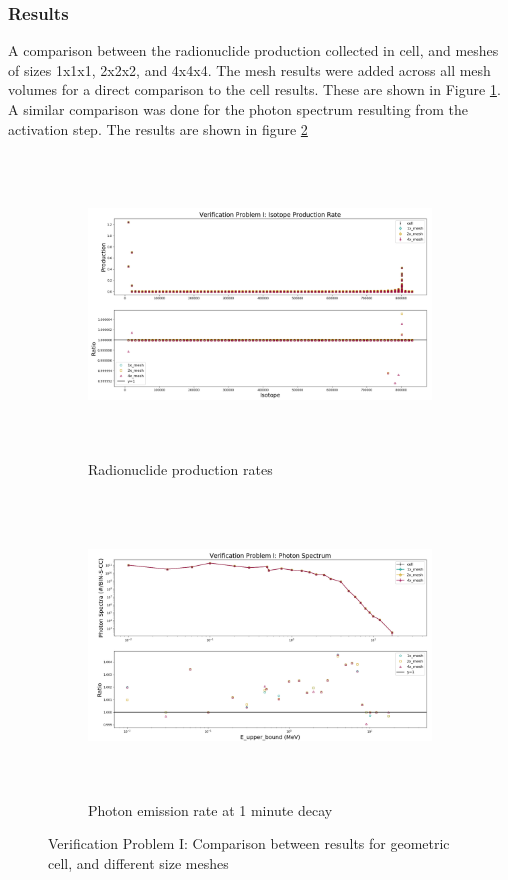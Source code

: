 \subsubsection{Results}
A comparison between the radionuclide production collected in cell,
and meshes of sizes 1x1x1, 2x2x2, and 4x4x4. The mesh results were added
across all mesh volumes for a direct
comparison to the cell results. These are shown in Figure \ref{fig:1prod_cell_2x_4x}.
A similar comparison was done for the photon spectrum resulting from the activation
step. The results are shown in figure \ref{fig:1spec_cell_2x_4x}
\begin{figure}[h!]
 \begin{centering}
 \centering
 \begin{subfigure}[b]{.8\textwidth}
 \includegraphics[width=0.99\linewidth,height=8cm]{../figs/toy_p1/prod_VPI_1x_2x_4x.png}
 \caption{Radionuclide production rates}
 \label{fig:1prod_cell_2x_4x}
 \end{subfigure}
 \hspace{0.05cm}
 \begin{subfigure}[b]{.8\textwidth}
 \centering
 \includegraphics[width=.99\linewidth,height=8cm]{../figs/toy_p1/spec_VPI_1x_2x_4x.png}
 \caption{Photon emission rate at 1 minute decay }
 \label{fig:1spec_cell_2x_4x}
 \end{subfigure}
 \caption{Verification Problem I: Comparison between results for geometric cell, and different size meshes}
 \label{cell_2x_4x}
 \end{centering}
\end{figure}
